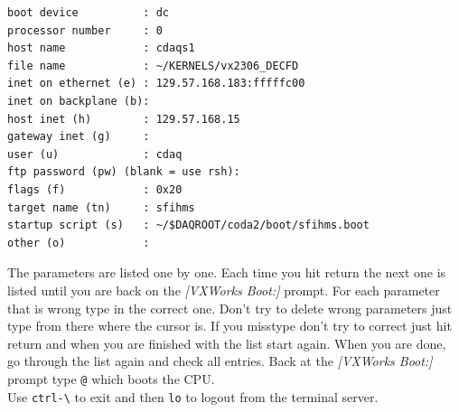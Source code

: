 \begin{verbatim}
boot device          : dc 
processor number     : 0 
host name            : cdaqs1 
file name            : ~/KERNELS/vx2306_DECFD 
inet on ethernet (e) : 129.57.168.183:fffffc00 
inet on backplane (b): 
host inet (h)        : 129.57.168.15
gateway inet (g)     : 
user (u)             : cdaq 
ftp password (pw) (blank = use rsh): 
flags (f)            : 0x20 
target name (tn)     : sfihms 
startup script (s)   : ~/$DAQROOT/coda2/boot/sfihms.boot 
other (o)            : 
\end{verbatim}

The parameters are listed one by one. Each time you 
hit return the next one is listed until you are back on 
the {\em [VXWorks Boot:]} prompt. For each parameter that is wrong
type in the correct one. Don't try to delete 
wrong parameters just type from there where the cursor is. If you misstype 
don't try to correct just hit return and when you are finished with the list 
start again. When you are done, go through the list again and check all 
entries.
Back at the {\em [VXWorks Boot:]} prompt type \verb|@|
which boots the CPU.\\ 
Use \verb|ctrl-\| to exit and then \verb|lo| to logout from the terminal 
server. 

